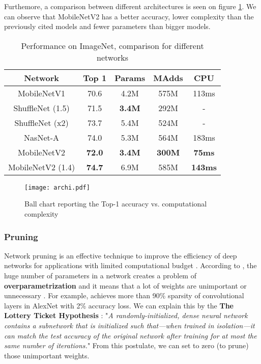 Furthemore, a comparison between different architectures is seen on figure \ref{fig:archi}. We can observe that MobileNetV2 has a better accuracy, lower complexity than the previously cited models and fewer parameters than bigger models.
%
\begin{table}
    \center
    \begin{tabular}{ | c | c | c c | c| }
        \hline \hline
        Network & Top 1 & Params & MAdds & CPU \\
        \hline \hline
        MobileNetV1 & 70.6 & 4.2M & 575M & 113ms \\
        ShuffleNet (1.5) & 71.5 & \textbf{3.4M} & 292M & - \\
        ShuffleNet (x2)  & 73.7 & 5.4M & 524M & - \\
        NasNet-A & 74.0 & 5.3M & 564M & 183ms \\
        \hline
        MobileNetV2 & \textbf{72.0} & \textbf{3.4M} & \textbf{300M} & \textbf{75ms} \\
        MobileNetV2 (1.4) & \textbf{74.7} & 6.9M & 585M & \textbf{143ms} \\
        \hline \hline
    \end{tabular}
    \caption{Performance on ImageNet, comparison for different networks \cite{sandler_mobilenetv2_2019}}
    \label{tab:mbv2}
\end{table}
%
\begin{figure}
    \centering
    \texttt{[image: archi.pdf]}
    \caption{Ball chart reporting the Top-1 accuracy vs. computational complexity \cite{canziani_analysis_2017}}
    \label{fig:archi}
\end{figure}
%
\subsubsection{Pruning} \label{subs:pruning}
Network pruning is an effective technique to improve the efficiency of deep networks for applications with limited computational budget \cite{liu_rethinking_2019}. According to \textcite{denton_exploiting_2014, liu_rethinking_2019}, the huge number of parameters in a network creates a problem of \textbf{overparametrization} and it means that a lot of weights are unimportant or unnecessary \cite{cheng_recent_2018}. For example, \textcite{baoyuan_liu_sparse_2015} achieves more than 90\% sparsity of convolutional layers in AlexNet with 2\% accuracy loss. We can explain this by the \textbf{The Lottery Ticket Hypothesis} \cite{frankle_lottery_2019, frankle_early_2020}: "\textit{A randomly-initialized, dense neural network contains a subnetwork that is initialized such that—when trained in isolation—it can match the test accuracy of the original network after training for at most the same number of iterations.}" From this postulate, we can set to zero (to prune) those unimportant weights. 

